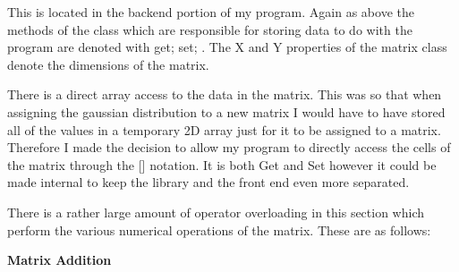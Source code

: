 \begin{FlushLeft}
    This is located in the backend portion of my program. Again as above the methods of the class which are responsible for storing data to do with the program are denoted with { get; set; }. The X and Y properties of the matrix class denote the dimensions of the matrix. \\ \bk
    
    There is a direct array access to the data in the matrix. This was so that when assigning the gaussian distribution to a new matrix I would have to have stored all of the values in a temporary 2D array just for it to be assigned to a matrix. Therefore I made the decision to allow my program to directly access the cells of the matrix through the [] notation. It is both Get and Set however it could be made internal to keep the library and the front end even more separated. \\ \bk

    There is a rather large amount of operator overloading in this section which perform the various numerical operations of the matrix. These are as follows: \\ \bk

    \textbf{Matrix Addition} \\ \bk
    {\,\!}\BK\BK\bk


\end{FlushLeft}
